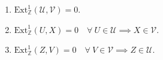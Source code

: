 \documentclass[preview]{standalone}
\begin{document}
\begin{center}
\begin{enumerate} \item $\text{Ext}^1_\mathbb{Z} (\mathcal{U}, \mathcal{V}) = 0$. \item $\text{Ext}^1_\mathbb{Z} (U, X) = 0 \quad \forall \ U\in\mathcal{U} \implies X\in\mathcal{V}$. \item $\text{Ext}^1_\mathbb{Z} (Z, V) = 0 \quad \forall \ V\in\mathcal{V} \implies Z\in\mathcal{U}$. \end{enumerate}
\end{center}
\end{document}

